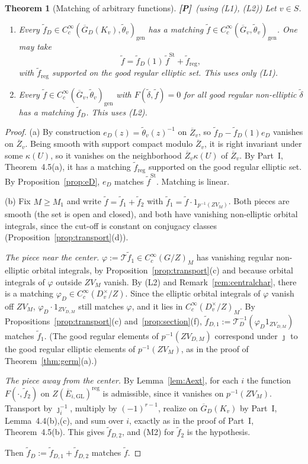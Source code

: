 \documentclass[12pt]{article}
\newcommand{\ov}[1]{\overline{#1}}
\newcommand{\gen}{\mathrm{gen}}
\newcommand{\reg}{\mathrm{reg}}
\newcommand{\GL}{\mathrm{GL}}
\newcommand{\St}{\mathrm{St}}
\newcommand{\Gb}{\ov{G}}
\newcommand{\Zb}{\ov{Z}}
\newcommand{\GDb}{\ov{G}_D}
\newcommand{\Eb}{\ov{E}}
\newcommand{\jj}{\jmath}
\newcommand{\Pv}{\textbf{[P]}}
\theoremstyle{plain}
\newtheorem{theorem}{Theorem}[section]
\theoremstyle{definition}
\begin{document}
\begin{theorem}[Matching of arbitrary functions]\label{thm:matching}\Pv\ (using (L1), (L2))
Let $v\in S$.
\begin{enumerate}[label=(\alph*)]
\item Every $\tilde f_D\in C_c^\infty(\GDb(K_v),\tilde\theta_v)_\gen$ has a matching $\tilde f\in C_c^\infty(\Gb_v,\tilde\theta_v)_\gen$. One may take
\[ \tilde f=\tilde f_D(1)\,\tilde f^{\St}+\tilde f_{\reg}, \]
with $\tilde f_{\reg}$ supported on the good regular elliptic set. This uses only (L1).
\item Every $\tilde f\in C_c^\infty(\Gb_v,\tilde\theta_v)_\gen$ with $F(\tilde\delta,\tilde f)=0$ for all good regular non-elliptic $\tilde\delta$ has a matching $\tilde f_D$. This uses (L2).
\end{enumerate}
\end{theorem}
\begin{proof}
(a) By construction $e_D(z)=\tilde\theta_v(z)^{-1}$ on $\Zb_v$, so $\tilde f_D-\tilde f_D(1)e_D$ vanishes on $\Zb_v$. Being smooth with support compact modulo $\Zb_v$, it is right invariant under some $\kappa(U)$, so it vanishes on the neighborhood $\Zb_v\kappa(U)$ of $\Zb_v$. By Part~I, Theorem~4.5(a), it has a matching $\tilde f_{\reg}$ supported on the good regular elliptic set. By Proposition~\ref{prop:eD}, $e_D$ matches $\tilde f^{\St}$. Matching is linear.

(b) Fix $M\ge M_1$ and write $\tilde f=\tilde f_1+\tilde f_2$ with $\tilde f_1=\tilde f\cdot1_{p^{-1}(ZV_M)}$. Both pieces are smooth (the set is open and closed), and both have vanishing non-elliptic orbital integrals, since the cut-off is constant on conjugacy classes (Proposition~\ref{prop:transport}(d)).

\emph{The piece near the center.} $\varphi:=\mathcal T\tilde f_1\in C_c^\infty(G/Z)_M$ has vanishing regular non-elliptic orbital integrals, by Proposition~\ref{prop:transport}(c) and because orbital integrals of $\varphi$ outside $ZV_M$ vanish. By (L2) and Remark~\ref{rem:centralchar}, there is a matching $\varphi_D\in C_c^\infty(D_v^\times/Z)$. Since the elliptic orbital integrals of $\varphi$ vanish off $ZV_M$, $\varphi_D\cdot1_{ZV_{D,M}}$ still matches $\varphi$, and it lies in $C_c^\infty(D_v^\times/Z)_M$. By Propositions~\ref{prop:transport}(c) and~\ref{prop:section}(f), $\tilde f_{D,1}:=\mathcal T_D^{-1}(\varphi_D1_{ZV_{D,M}})$ matches $\tilde f_1$. (The good regular elements of $p^{-1}(ZV_{D,M})$ correspond under $\jj$ to the good regular elliptic elements of $p^{-1}(ZV_M)$, as in the proof of Theorem~\ref{thm:germ}(a).)

\emph{The piece away from the center.} By Lemma~\ref{lem:Aext}, for each $i$ the function $F(\cdot,\tilde f_2)$ on $Z(\Eb_{i,\GL})^{\reg}$ is admissible, since it vanishes on $p^{-1}(ZV_M)$. Transport by $\jj_i^{-1}$, multiply by $(-1)^{r-1}$, realize on $\GDb(K_v)$ by Part~I, Lemma~4.4(b),(c), and sum over $i$, exactly as in the proof of Part~I, Theorem~4.5(b). This gives $\tilde f_{D,2}$, and (M2) for $\tilde f_2$ is the hypothesis.

Then $\tilde f_D:=\tilde f_{D,1}+\tilde f_{D,2}$ matches $\tilde f$.
\end{proof}
\end{document}
